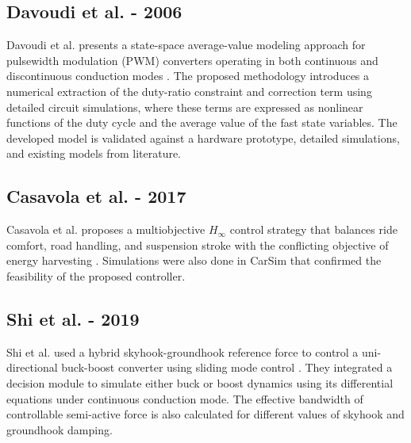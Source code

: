    \subsection{Davoudi et al. - 2006}
    Davoudi et al. presents a state-space average-value modeling approach for pulsewidth modulation (PWM) converters operating in both continuous and discontinuous conduction modes \cite{davoudi2006numerical}. The proposed methodology introduces a numerical extraction of the duty-ratio constraint and correction term using detailed circuit simulations, where these terms are expressed as nonlinear functions of the duty cycle and the average value of the fast state variables. The developed model is validated against a hardware prototype, detailed simulations, and existing models from literature.

  \subsection{Casavola et al. - 2017}
    Casavola et al. proposes a multiobjective $H_{\infty}$ control strategy that balances ride comfort,
    road handling, and suspension stroke with the conflicting objective of energy harvesting \cite{Casavola03042018}. Simulations were also done in CarSim that confirmed the feasibility of the proposed controller.
    
   \subsection{Shi et al. - 2019}
   Shi et al. used a hybrid skyhook-groundhook reference force to control a uni-directional buck-boost converter using sliding mode control \cite{shi2019research}. They integrated a decision module to simulate either buck or boost dynamics using its differential equations under continuous conduction mode. The effective bandwidth of controllable semi-active force is also calculated for different values of skyhook and groundhook damping.